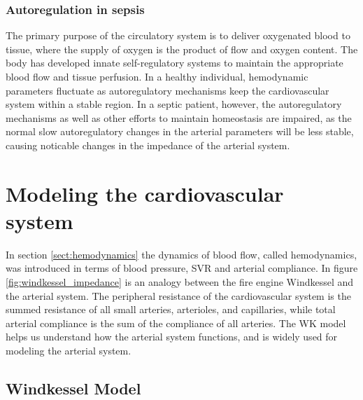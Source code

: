 \subsubsection{Autoregulation in sepsis}\label{sect:autoregulation_sepsis}

The primary purpose of the circulatory system is to deliver oxygenated blood to tissue, where the supply of oxygen is the product of flow and oxygen content.\cite{RN11} The body has developed innate self-regulatory systems to maintain the appropriate blood flow and tissue perfusion. In a healthy individual, hemodynamic parameters fluctuate as autoregulatory mechanisms keep the cardiovascular system within a stable region. In a septic patient, however, the autoregulatory mechanisms as well as other efforts to maintain homeostasis are impaired, as the normal slow autoregulatory changes in the arterial parameters will be less stable, causing noticable changes in the impedance of the arterial system.







\section{Modeling the cardiovascular system} \label{sect:modeling}

In section \ref{sect:hemodynamics} the dynamics of blood flow, called hemodynamics, was introduced in terms of blood pressure, SVR and arterial compliance. In figure \ref{fig:windkessel_impedance} is an analogy between the fire engine Windkessel and the arterial system. The peripheral resistance of the cardiovascular system is the summed resistance of all small arteries, arterioles, and capillaries, while total arterial compliance is the sum of the compliance of all arteries. The WK model helps us understand how the arterial system functions, and is widely used for modeling the arterial system. 


\subsection{Windkessel Model} \label{sect:WK}

